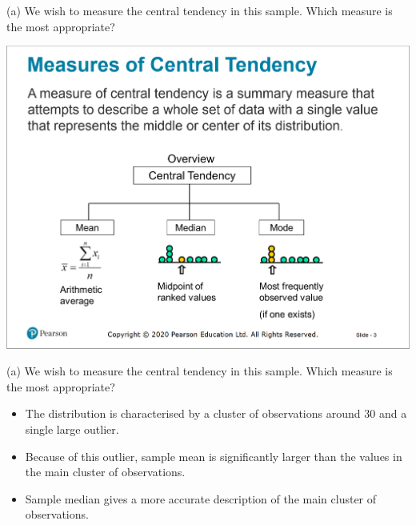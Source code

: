 \documentclass[
  11pt,
  ignorenonframetext,
]{beamer}
\begin{document}
\begin{frame}{(a) We wish to measure the central tendency in this
sample. Which measure is the most appropriate?}
\protect\hypertarget{a-we-wish-to-measure-the-central-tendency-in-this-sample.-which-measure-is-the-most-appropriate}{}
\pause

\begin{center}\includegraphics[width=0.8\linewidth]{pictures/Central Tendency} \end{center}
\end{frame}

\begin{frame}{(a) We wish to measure the central tendency in this
sample. Which measure is the most appropriate?}
\protect\hypertarget{a-we-wish-to-measure-the-central-tendency-in-this-sample.-which-measure-is-the-most-appropriate-1}{}
\begin{itemize}
\item
  The distribution is characterised by a cluster of observations around
  \(30\) and a single large outlier.
\item
  Because of this outlier, sample mean is significantly larger than the
  values in the main cluster of observations.
\item
  Sample median gives a more accurate description of the main cluster of
  observations.
\end{itemize}
\end{frame}
\end{document}
